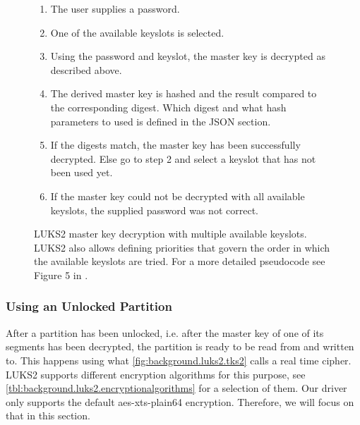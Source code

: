 \begin{figure}[htb!]
	\center
	\begin{mdframed}
		\begin{enumerate}
			\item The user supplies a password.
			\item One of the available keyslots is selected.
			\item Using the password and keyslot, the master key is decrypted as described above.
			\item The derived master key is hashed and the result compared to the corresponding digest. Which digest and what hash parameters to used is defined in the JSON section.
			\item If the digests match, the master key has been successfully decrypted. Else go to step 2 and select a keyslot that has not been used yet.
			\item If the master key could not be decrypted with all available keyslots, the supplied password was not correct.
		\end{enumerate}
	\end{mdframed}
	\caption[
		LUKS2 master key decryption with multiple available keyslots
	]{
		LUKS2 master key decryption with multiple available keyslots. LUKS2 also allows defining priorities that govern the order in which the available keyslots are tried. For a more detailed pseudocode see Figure 5 in \cite{Fruwirth2018}.
	}
	\label{fig:background.luks2.unlocking}
\end{figure}

\subsubsection{Using an Unlocked Partition}
\label{chap:background.luks2.using}
After a partition has been unlocked, i.e. after the master key of one of its segments has been decrypted, the partition is ready to be read from and written to. This happens using what \autoref{fig:background.luks2.tks2} calls a real time cipher. LUKS2 supports different encryption algorithms for this purpose, see \autoref{tbl:background.luks2.encryptionalgorithms} for a selection of them. Our driver only supports the default aes-xts-plain64 encryption. Therefore, we will focus on that in this section.

